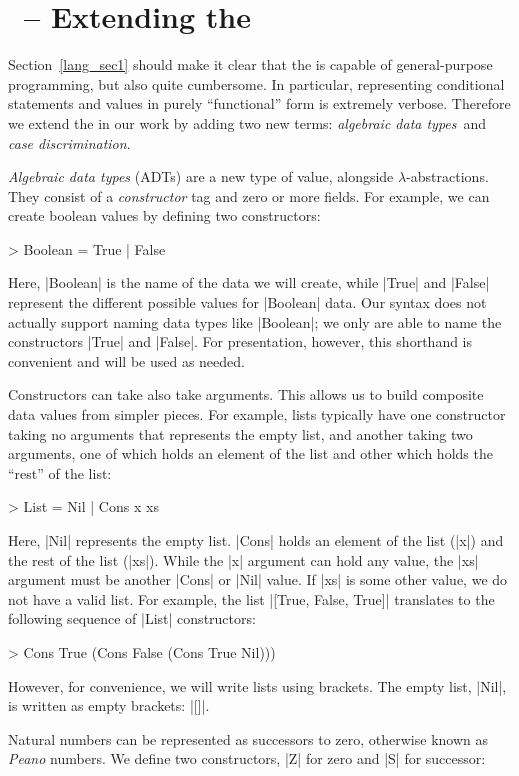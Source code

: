 \documentclass[12pt]{report}
\begin{document}
\section{\lamC\ -- Extending the \lamA}
\label{lang_sec4}
Section~\ref{lang_sec1} should make it clear that the \lamA is capable
of general-purpose programming, but also quite cumbersome. In
particular, representing conditional statements and values in purely
``functional'' form is extremely verbose. Therefore we extend the
\lamA in our work by adding two new terms: \emph{algebraic data
  types}\ and \emph{case discrimination}.

\emph{Algebraic data types} (ADTs) are a new type of value, alongside
$\lambda$-abstractions.  They consist of a \emph{constructor} tag and
zero or more fields. For example, we can create boolean values by
defining two constructors:

> Boolean = True | False

Here, |Boolean| is the name of the data we will create, while |True| and
|False| represent the different possible values for |Boolean| data. Our syntax
does not actually support naming data types like |Boolean|; we only are able
to name the constructors |True| and |False|. For presentation, however, this
shorthand is convenient and will be used as needed.

Constructors can take also take arguments. This allows us to build
composite data values from simpler pieces. For example, lists
typically have one constructor taking no arguments that represents the
empty list, and another taking two arguments, one of which holds an
element of the list and other which holds the ``rest'' of the list:

> List = Nil | Cons x xs

Here, |Nil| represents the empty list. |Cons| holds an element of the
list (|x|) and the rest of the list (|xs|). While the |x| argument can
hold any value, the |xs| argument must be another |Cons| or |Nil|
value. If |xs| is some other value, we do not have a valid list. For
example, the list |[True, False, True]| translates to the following
sequence of |List| constructors:

> Cons True (Cons False (Cons True Nil))) 

However, for convenience, we will write lists using brackets. The
empty list, |Nil|, is written as empty brackets: |[]|.

Natural numbers can be represented as successors to zero, otherwise
known as \emph{Peano} numbers. We define two constructors, |Z| for
zero and |S| for successor:
\end{document}
